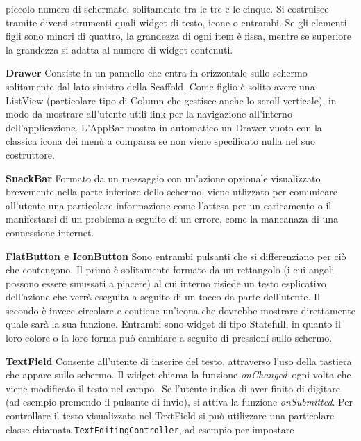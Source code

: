 \begin{trivlist}
		piccolo numero di schermate, solitamente tra le tre e le cinque.
		Si costruisce tramite diversi strumenti quali widget di testo, icone o
		entrambi. Se gli elementi figli sono minori di quattro, la grandezza di
		ogni item è fissa, mentre se superiore la grandezza si adatta al numero
		di widget contenuti.
		\item \textbf{Drawer} \newline
		Consiste in un pannello che entra in orizzontale sullo schermo
		solitamente dal lato sinistro della Scaffold. Come figlio è solito avere
		una ListView (particolare tipo di Column che gestisce anche lo scroll
		verticale), in modo da mostrare all'utente utili link per la navigazione
		all'interno dell'applicazione. L'AppBar mostra in automatico un Drawer
		vuoto con la classica icona dei menù a comparsa se non viene specificato
		nulla nel suo costruttore.
		\item \textbf{SnackBar} \newline
		Formato da un messaggio con un'azione opzionale visualizzato brevemente
		nella parte inferiore dello schermo, viene utlizzato per comunicare
		all'utente una particolare informazione come l'attesa per un caricamento
		o il manifestarsi di un problema a seguito di un errore, come la
		mancanaza di una connessione internet.
		\item \textbf{FlatButton e IconButton} \newline
		Sono entrambi pulsanti che si differenziano per ciò che contengono. Il
		primo è solitamente formato da un rettangolo (i cui angoli possono
		essere smussati a piacere) al cui interno risiede un testo esplicativo
		dell'azione che verrà eseguita a seguito di un tocco da parte
		dell'utente. Il secondo è invece circolare e contiene un'icona che
		dovrebbe mostrare direttamente quale sarà la sua funzione. Entrambi sono
		widget di tipo Statefull, in quanto il loro colore o la loro forma può
		cambiare a seguito di pressioni sullo schermo.
		\item \textbf{TextField} \newline
		Consente all'utente di inserire del testo, attraverso l'uso della
		tastiera che appare sullo schermo. Il widget chiama la funzione
		\textit{onChanged} ogni volta che viene modificato il testo nel campo. Se
		l'utente indica di aver finito di digitare (ad esempio
		premendo il pulsante di invio), si attiva
		la funzione \textit{onSubmitted}. Per controllare il testo visualizzato nel
		TextField si può utilizzare una particolare classe chiamata
		\verb|TextEditingController|, ad esempio per impostare

\end{trivlist}
